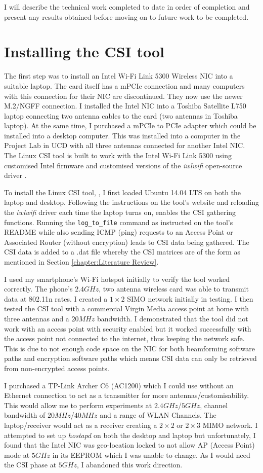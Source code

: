 I will describe the technical work completed to date in order of completion and present any results obtained before moving on to future work to be completed. 
\section{Installing the CSI tool}
The first step was to install an Intel Wi-Fi Link 5300 Wireless NIC into a suitable laptop. The card itself has a mPCIe connection and many computers with this connection for their NIC are discontinued. They now use the newer M.2/NGFF connection. I installed the Intel NIC into a Toshiba Satellite L750 laptop connecting two antenna cables to the card (two antennas in Toshiba laptop). At the same time, I purchased a mPCIe to PCIe adapter which could be installed into a desktop computer. This was installed into a computer in the Project Lab in UCD with all three antennas connected for another Intel NIC. The Linux CSI tool is built to work with the Intel Wi-Fi Link 5300 using customised Intel firmware and customised versions of the \textit{iwlwifi} open-source driver \citep{Halperin_csitool}. \par
To install the Linux CSI tool, \cite{Halperin_csitool}, I first loaded Ubuntu 14.04 LTS on both the laptop and desktop. 
Following the instructions on the tool's website and reloading the \textit{iwlwifi} driver each time the laptop turns on, enables the CSI gathering functions. Running the \lstinline{log_to_file} command as instructed on the tool's README while also sending ICMP (ping) requests to an Access Point or Associated Router (without encryption) leads to CSI data being gathered. The CSI data is added to a .dat file whereby the CSI matrices are of the form as mentioned in Section \ref{chapter:Literature Review}. \par
I used my smartphone's Wi-Fi hotspot initially to verify the tool worked correctly. The phone's $2.4GHz$, two antenna wireless card was able to transmit data at 802.11n rates. I created a $1\times 2$ SIMO network initially in testing. I then tested the CSI tool with a commercial Virgin Media access point at home with three antennas and a $20MHz$ bandwidth. I demonstrated that the tool did not work with an access point with security enabled but it worked successfully with the access point not connected to the internet, thus keeping the network safe. This is due to not enough code space on the NIC for both beamforming software paths and encryption software paths which means CSI data can only be retrieved from non-encrypted access points.  \par
I purchased a TP-Link Archer C6 (AC1200) which I could use without an Ethernet connection to act as a transmitter for more antennas/customisability. This would allow me to perform experiments at $2.4GHz$/$5GHz$, channel bandwidth of $20MHz$/$40MHz$ and a range of WLAN Channels. The laptop/receiver would act as a receiver creating a $2\times 2$ or $2\times 3$ MIMO network. I attempted to set up \textit{hostapd} on both the desktop and laptop but unfortunately, I found that the Intel NIC was geo-location locked to not allow AP (Access Point) mode at $5GHz$ in its EEPROM which I was unable to change. As I would need the CSI phase at $5GHz$, I abandoned this work direction. 
